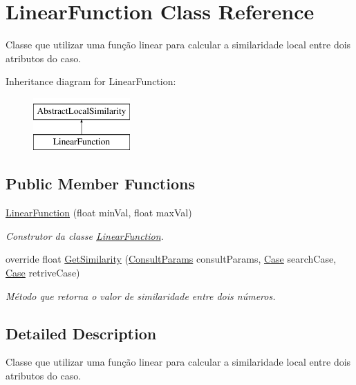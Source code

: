 \hypertarget{class_linear_function}{}\section{Linear\+Function Class Reference}
\label{class_linear_function}


Classe que utilizar uma função linear para calcular a similaridade local entre dois atributos do caso.  


Inheritance diagram for Linear\+Function\+:\begin{figure}[H]
\begin{center}
\leavevmode
\includegraphics[height=2.000000cm]{class_linear_function}
\end{center}
\end{figure}
\subsection*{Public Member Functions}
\begin{DoxyCompactItemize}
\item 
\hyperlink{class_linear_function_ac8a3882badd498ea34c032d63aca3715}{Linear\+Function} (float min\+Val, float max\+Val)
\begin{DoxyCompactList}\small\item\em Construtor da classe \hyperlink{class_linear_function}{Linear\+Function}. \end{DoxyCompactList}\item 
override float \hyperlink{class_linear_function_addbfc2ff35037c40ae27c30e993e82ca}{Get\+Similarity} (\hyperlink{class_consult_params}{Consult\+Params} consult\+Params, \hyperlink{class_case}{Case} search\+Case, \hyperlink{class_case}{Case} retrive\+Case)
\begin{DoxyCompactList}\small\item\em Método que retorna o valor de similaridade entre dois números. \end{DoxyCompactList}\end{DoxyCompactItemize}


\subsection{Detailed Description}
Classe que utilizar uma função linear para calcular a similaridade local entre dois atributos do caso. 



